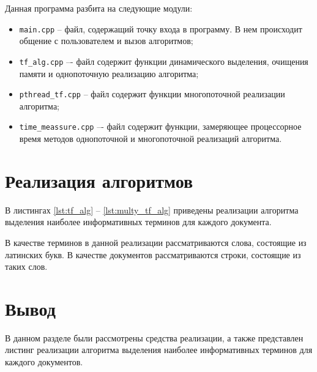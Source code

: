 Данная программа разбита на следующие модули:

\begin{itemize}[label=---]
	\item \texttt{main.cpp} -- файл, содержащий точку входа в программу. В нем происходит общение с пользователем и вызов алгоритмов;
	\item \texttt{tf\_alg.cpp} –- файл содержит функции динамического выделения, очищения памяти и однопоточную реализацию алгоритма;
	\item \texttt{pthread\_tf.cpp} -- файл содержит функции многопоточной реализации алгоритма;
	\item \texttt{time\_meassure.cpp} –- файл содержит функции, замеряющее процессорное время методов однопоточной и многопоточной реализаций алгоритма.
\end{itemize}

\section{Реализация алгоритмов}

В листингах \ref{lst:tf_alg} -- \ref{lst:multy_tf_alg} приведены реализации алгоритма выделения наиболее информативных терминов для каждого документа.

В качестве терминов в данной реализации рассматриваются слова, состоящие из латинских букв. В качестве документов рассматриваются строки, состоящие из таких слов.

\clearpage



\clearpage



\clearpage




\section*{Вывод}

В данном разделе были рассмотрены средства реализации, а также представлен листинг реализации алгоритма выделения наиболее информативных терминов для каждого документов.